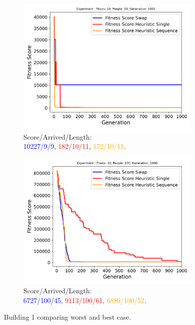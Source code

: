 \begin{figure}[ht]
	\centering
	\begin{subfigure}[b]{0.49\linewidth}
		\centering
		\includegraphics[width=\linewidth]{results/Building1/Mutation_0.1/Floors: 10, People: 10, Generation: 1000_worst.png}
		\captionsetup{justification=centering,font=tiny}
		\caption{Score/Arrived/Length:\\\textcolor{blue}{10227/9/9}, \textcolor{red}{182/10/11}, \textcolor{orange}{172/10/11}.}
		\label{fig:Building1 worst}
	\end{subfigure}
	\hfill
	\begin{subfigure}[b]{0.49\linewidth}
		\centering
		\includegraphics[width=\linewidth]{results/Building1/Mutation_0.1/Floors: 10, People: 100, Generation: 1000.png}
		\captionsetup{justification=centering,font=tiny}
		\caption{Score/Arrived/Length:\\\textcolor{blue}{6727/100/45}, \textcolor{red}{9113/100/61}, \textcolor{orange}{6880/100/52}.}
		\label{fig:Building1 100 people}
	\end{subfigure}
	\captionsetup{font=scriptsize}
	\caption{Building 1 comparing worst and best case.}
	\label{fig:Building1 results}
\end{figure}

